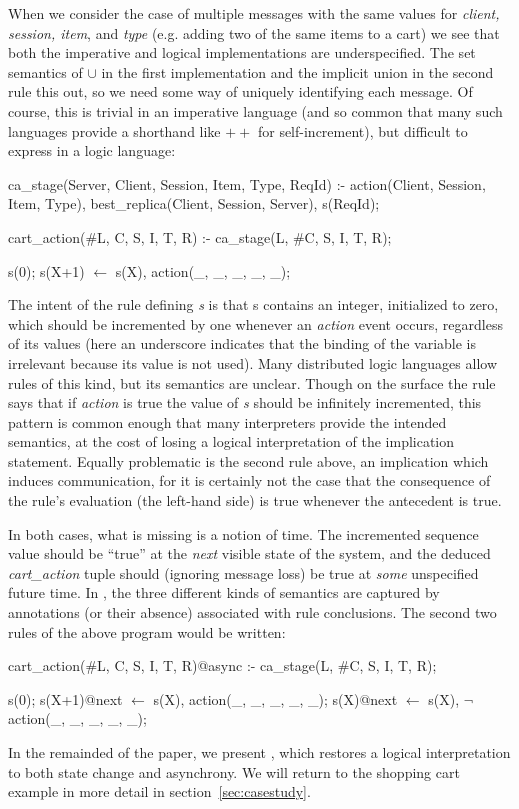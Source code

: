 When we consider the case of multiple messages with the same values for
{\em client, session, item}, and {\em type} (e.g. adding two of the same items to a cart)
we see that both the imperative and logical implementations are underspecified.
The set semantics of $\cup$ in the first implementation and the implicit union 
in the second rule this out, so we need some way of uniquely identifying each message.
Of course, this is trivial in an imperative language (and so common that many such languages
provide a shorthand like $++$ for self-increment), but difficult to express in a logic language:

\begin{Dedalus}
ca_stage(Server, Client, Session, Item, Type, ReqId) :-
  action(Client, Session, Item, Type),
  best_replica(Client, Session, Server),
  s(ReqId);

cart_action(#L, C, S, I, T, R) :-
  ca_stage(L, #C, S, I, T, R);

s(0);
s(X+1) \(\leftarrow\)  s(X), action(_, _, _, _, _);

\end{Dedalus}


The intent of the rule defining {\em s} is that s contains an integer, initialized to
zero, which should be incremented by one whenever an {\em action} event occurs,
regardless of its values (here an underscore indicates that the binding of the variable
is irrelevant because its value is not used).  
Many distributed logic languages allow rules of this kind,
but its semantics are unclear.  Though on the surface the rule says that if {\em action} is true
the value of {\em s} should be infinitely incremented, this pattern is common enough
that many interpreters provide the intended semantics, at the cost of losing a logical
interpretation of the implication statement.  Equally problematic is the second rule above,
an implication which induces communication, for it is certainly not the case that the consequence of the rule's evaluation (the left-hand side) is true whenever the antecedent is
true.  

In both cases, what is missing is a notion of time.  The incremented sequence value should
be ``true'' at the {\em next} visible state of the system, and the deduced {\em cart\_action}
tuple should (ignoring message loss) be true at {\em some} unspecified future time.  In \lang,
the three different kinds of semantics are captured by annotations (or their absence) 
associated with rule conclusions.  The second two rules of the above program would be
written:

\begin{Dedalus}

cart_action(#L, C, S, I, T, R)@async :-
  ca_stage(L, #C, S, I, T, R);

s(0);
s(X+1)@next \(\leftarrow\)  s(X), action(_, _, _, _, _);
s(X)@next \(\leftarrow\)  s(X), \(\lnot\) action(_, _, _, _, _);

\end{Dedalus}


In the remainded of the paper, we present \lang, which restores a logical interpretation to
both state change and asynchrony.  We will return to the shopping cart example in more detail 
in section~\ref{sec:casestudy}.

